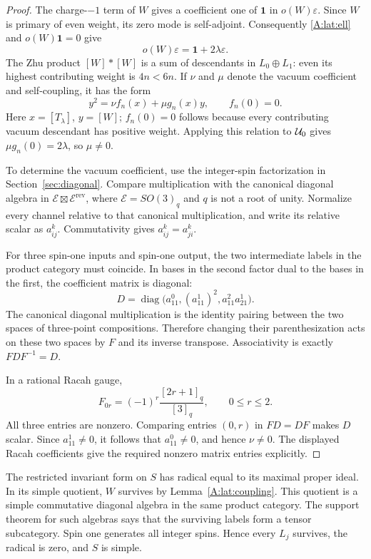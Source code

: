 \documentclass[11pt]{article}
\newcommand{\one}{\mathbf1}\newcommand{\D}{\mathcal D}\newcommand{\Dcat}{\mathcal D}
\numberwithin{equation}{section}
\begin{document}
\begin{proof}
The charge-$-1$ term of $W$ gives a coefficient one of $\one$ in $o(W)\varepsilon$. Since $W$ is primary of even weight, its zero mode is self-adjoint. Consequently \eqref{A:lat:ell} and $o(W)\one=0$ give
\begin{equation}\label{A:lat:zero}
 o(W)\varepsilon=\one+2\lambda\varepsilon.
\end{equation}
The Zhu product $[W]*[W]$ is a sum of descendants in $L_0\oplus L_1$: even its highest contributing weight is $4n<6n$. If $\nu$ and $\mu$ denote the vacuum coefficient and self-coupling, it has the form
\[
 y^2=\nu f_n(x)+\mu g_n(x)y,\qquad f_n(0)=0.
\]
Here $x=[T_\lambda]$, $y=[W]$; $f_n(0)=0$ follows because every contributing vacuum descendant has positive weight. Applying this relation to $\mathcal U_0$ gives $\mu g_n(0)=2\lambda$, so $\mu\ne0$.

To determine the vacuum coefficient, use the integer-spin factorization in Section~\ref{sec:diagonal}. Compare multiplication with the canonical diagonal algebra in $\mathcal E\boxtimes\mathcal E^{\mathrm{rev}}$, where $\mathcal E=SO(3)_q$ and $q$ is not a root of unity. Normalize every channel relative to that canonical multiplication, and write its relative scalar as $a_{ij}^k$. Commutativity gives $a_{ij}^k=a_{ji}^k$.

For three spin-one inputs and spin-one output, the two intermediate labels in the product category must coincide. In bases in the second factor dual to the bases in the first, the coefficient matrix is diagonal:
\[
 D=\operatorname{diag}\big(a_{11}^0,(a_{11}^1)^2,a_{11}^2a_{21}^1\big).
\]
The canonical diagonal multiplication is the identity pairing between the two spaces of three-point compositions. Therefore changing their parenthesization acts on these two spaces by $F$ and its inverse transpose. Associativity is exactly $FDF^{-1}=D$. 

In a rational Racah gauge,
\[
 F_{0r}=(-1)^r\frac{[2r+1]_q}{[3]_q},\qquad 0\leq r\leq2.
\]
All three entries are nonzero. Comparing entries $(0,r)$ in $FD=DF$ makes $D$ scalar. Since $a_{11}^1\ne0$, it follows that $a_{11}^0\ne0$, and hence $\nu\ne0$. The displayed Racah coefficients give the required nonzero matrix entries explicitly.
\end{proof}

The restricted invariant form on $S$ has radical equal to its maximal proper ideal. In its simple quotient, $W$ survives by Lemma~\ref{A:lat:coupling}. This quotient is a simple commutative diagonal algebra in the same product category. The support theorem for such algebras \cite[Proposition 4.4]{A:CKM} says that the surviving labels form a tensor subcategory. Spin one generates all integer spins. Hence every $L_j$ survives, the radical is zero, and $S$ is simple.
\end{document}
